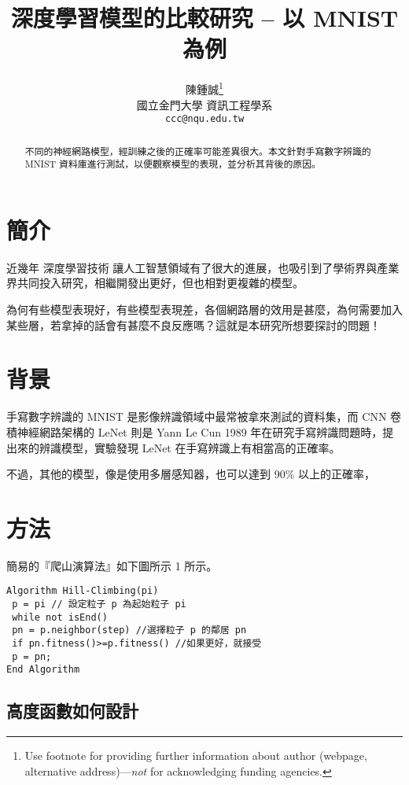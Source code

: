 \documentclass{article}
\title{深度學習模型的比較研究 -- 以 MNIST 為例}
\author{
  陳鍾誠\thanks{Use footnote for providing further
    information about author (webpage, alternative
    address)---\emph{not} for acknowledging funding agencies.} \\
  國立金門大學 資訊工程學系\\
  \texttt{ccc@nqu.edu.tw} \\
}
\begin{document}
\maketitle

\begin{abstract}
不同的神經網路模型，經訓練之後的正確率可能差異很大。本文針對手寫數字辨識的MNIST 資料庫進行測試，以便觀察模型的表現，並分析其背後的原因。
\end{abstract}




\section{簡介}

近幾年 深度學習技術 讓人工智慧領域有了很大的進展，也吸引到了學術界與產業界共同投入研究，相繼開發出更好，但也相對更複雜的模型。

為何有些模型表現好，有些模型表現差，各個網路層的效用是甚麼，為何需要加入某些層，若拿掉的話會有甚麼不良反應嗎？這就是本研究所想要探討的問題！

\section{背景}
\label{background}

手寫數字辨識的 MNIST 是影像辨識領域中最常被拿來測試的資料集，而 CNN 卷積神經網路架構的 LeNet 則是 Yann Le Cun 1989 年在研究手寫辨識問題時，提出來的辨識模型，實驗發現 LeNet 在手寫辨識上有相當高的正確率。

不過，其他的模型，像是使用多層感知器，也可以達到 90\% 以上的正確率，


\section{方法}

簡易的『爬山演算法』如下圖所示
1 所示。

\begin{verbatim}
Algorithm Hill-Climbing(pi)
 p = pi // 設定粒子 p 為起始粒子 pi
 while not isEnd()
 pn = p.neighbor(step) //選擇粒子 p 的鄰居 pn
 if pn.fitness()>=p.fitness() //如果更好，就接受
 p = pn;
End Algorithm
\end{verbatim}

\subsection{高度函數如何設計}
\end{document}
